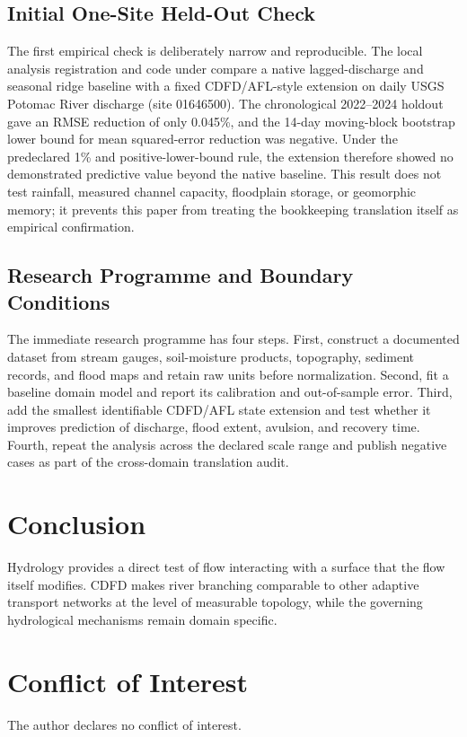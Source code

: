 \documentclass[11pt,a4paper]{article}
\begin{document}
\subsection{Initial One-Site Held-Out Check}

The first empirical check is deliberately narrow and reproducible. The local
analysis registration and code under
 compare a native
lagged-discharge and seasonal ridge baseline with a fixed CDFD/AFL-style
extension on daily USGS Potomac River discharge (site 01646500). The
chronological 2022--2024 holdout gave an RMSE reduction of only 0.045\%, and
the 14-day moving-block bootstrap lower bound for mean squared-error reduction
was negative. Under the predeclared 1\% and positive-lower-bound rule, the
extension therefore showed no demonstrated predictive value beyond the native
baseline. This result does not test rainfall, measured channel capacity,
floodplain storage, or geomorphic memory; it prevents this paper from treating
the bookkeeping translation itself as empirical confirmation.

\subsection{Research Programme and Boundary Conditions}

The immediate research programme has four steps. First, construct a documented
dataset from stream gauges, soil-moisture products, topography, sediment records, and flood maps and retain raw units before normalization.
Second, fit a baseline domain model and report its calibration and out-of-sample
error. Third, add the smallest identifiable CDFD/AFL state extension and test
whether it improves prediction of discharge, flood extent, avulsion, and recovery time. Fourth, repeat the
analysis across the declared scale range and publish negative cases as part of
the cross-domain translation audit.


\section{Conclusion}
Hydrology provides a direct test of flow interacting with a surface that the flow itself modifies. CDFD makes river branching comparable to other adaptive transport networks at the level of measurable topology, while the governing hydrological mechanisms remain domain specific.
\section*{Conflict of Interest} The author declares no conflict of interest.
\end{document}
